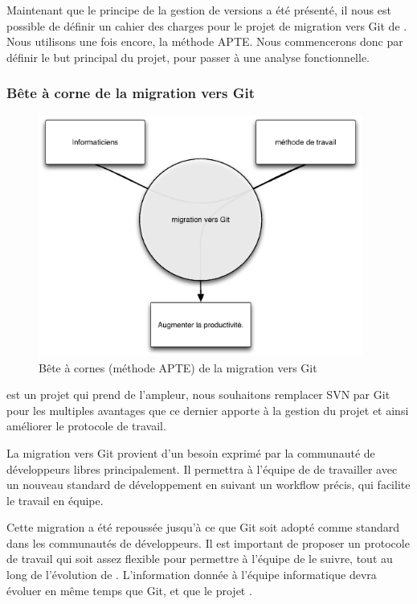 Maintenant que le principe de la gestion de versions a été présenté,
il nous est possible de définir un cahier des charges
pour le projet de migration vers Git de {\gofigure}.
Nous utilisons une fois encore, la méthode {APTE\textregistered}.
Nous commencerons donc par définir le but principal du projet, pour passer à une analyse fonctionnelle.

\subsubsection*{Bête à corne de la migration vers Git}

\begin{figure}[h]
\begin{center}
\leavevmode
\includegraphics[width=0.95\textwidth]{pictures/GitBAC}
\end{center}
\caption{Bête à cornes (méthode {APTE\textregistered}) de la migration vers Git}
\label{fig:BACGit}
\end{figure}

{\gofigure} est un projet qui prend de l'ampleur,
nous souhaitons remplacer SVN par Git pour les multiples avantages
que ce dernier apporte à la gestion du projet et ainsi améliorer le protocole de travail.

La migration vers Git provient d'un besoin exprimé par la communauté de développeurs libres principalement.
Il permettra à l'équipe de {\gofigure} de travailler 
avec un nouveau standard de développement en suivant un workflow précis, qui facilite le travail en équipe.

Cette migration a été repoussée jusqu'à ce que Git soit adopté comme standard dans les communautés de développeurs.
Il est important de proposer un protocole de travail qui soit assez flexible pour permettre à l'équipe de le suivre,
tout au long de l'évolution de {\gofigure}.
L'information donnée à l'équipe informatique devra évoluer en même temps que Git, et que le projet {\gofigure}.


